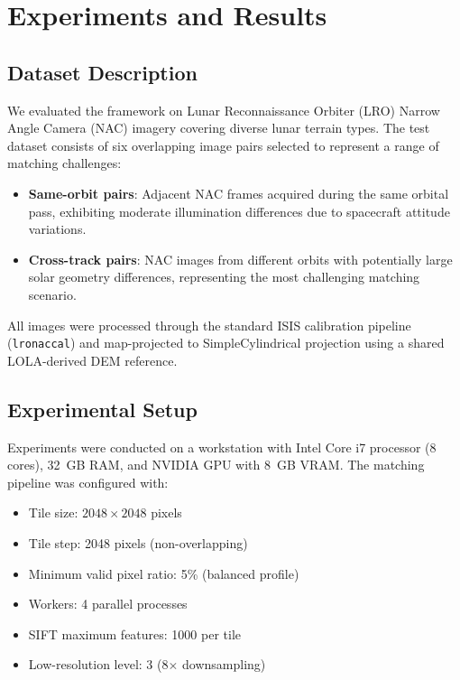 \documentclass[lettersize,journal]{IEEEtran}
\begin{document}

\section{Experiments and Results}\label{sec:experiments}

\subsection{Dataset Description}

We evaluated the framework on Lunar Reconnaissance Orbiter (LRO) Narrow Angle Camera (NAC) imagery covering diverse lunar terrain types. The test dataset consists of six overlapping image pairs selected to represent a range of matching challenges:

\begin{itemize}
    \item \textbf{Same-orbit pairs}: Adjacent NAC frames acquired during the same orbital pass, exhibiting moderate illumination differences due to spacecraft attitude variations.
    \item \textbf{Cross-track pairs}: NAC images from different orbits with potentially large solar geometry differences, representing the most challenging matching scenario.
\end{itemize}

All images were processed through the standard ISIS calibration pipeline (\texttt{lronaccal}) and map-projected to SimpleCylindrical projection using a shared LOLA-derived DEM reference.

\subsection{Experimental Setup}

Experiments were conducted on a workstation with Intel Core i7 processor (8 cores), 32~GB RAM, and NVIDIA GPU with 8~GB VRAM. The matching pipeline was configured with:

\begin{itemize}
    \item Tile size: $2048 \times 2048$ pixels
    \item Tile step: 2048 pixels (non-overlapping)
    \item Minimum valid pixel ratio: 5\% (balanced profile)
    \item Workers: 4 parallel processes
    \item SIFT maximum features: 1000 per tile
    \item Low-resolution level: 3 (8$\times$ downsampling)
\end{itemize}
\end{document}
